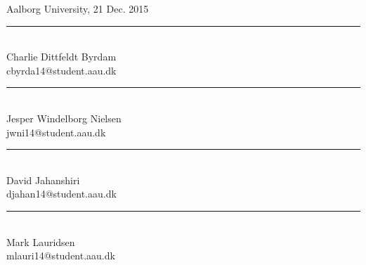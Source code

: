 \clearpage

\vspace{\baselineskip}\hfill Aalborg University, 21 Dec. 2015


\vfill\noindent
\begin{minipage}[b]{0.45\textwidth}
 \centering
 \rule{\textwidth}{0.5pt}\\
  Charlie Dittfeldt Byrdam\\
 {\footnotesize cbyrda14@student.aau.dk}
\end{minipage}
\hfill
\vspace{3\baselineskip}
\begin{minipage}[b]{0.45\textwidth}
 \centering
 \rule{\textwidth}{0.5pt}\\
  Jesper Windelborg Nielsen\\
 {\footnotesize jwni14@student.aau.dk}
\end{minipage}
\hfill
\vspace{3\baselineskip}
\begin{minipage}[b]{0.45\textwidth}
 \centering
 \rule{\textwidth}{0.5pt}\\
  David Jahanshiri\\
 {\footnotesize djahan14@student.aau.dk}
\end{minipage}
\hfill
\begin{minipage}[b]{0.45\textwidth}
 \centering
 \rule{\textwidth}{0.5pt}\\
  Mark Lauridsen\\
 {\footnotesize mlauri14@student.aau.dk}
\end{minipage}
\hfill
